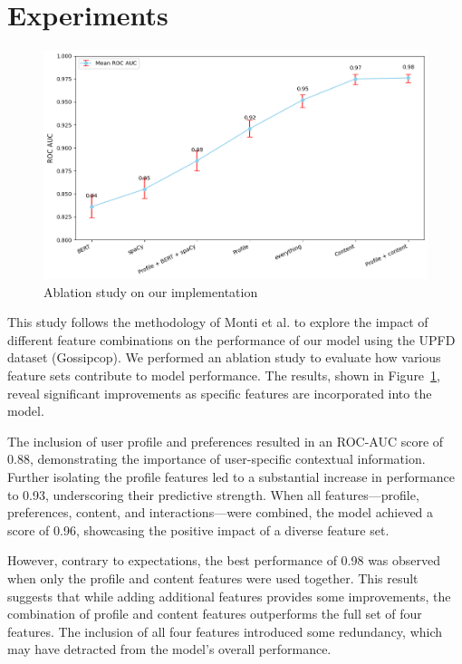 \documentclass[sigconf,nonacm]{acmart}
\begin{document}
\section{Experiments}
\begin{figure}
    \centering
    \includegraphics[scale=0.35]{roc_results.png}
    \caption{Ablation study on our implementation}
    \label{fig:ablation_results}
\end{figure}

This study follows the methodology of Monti et al. \cite{monti2019fakenewsdetectionsocial} to explore the impact of different feature combinations on the performance of our model using the UPFD dataset (Gossipcop). We performed an ablation study to evaluate how various feature sets contribute to model performance. The results, shown in Figure~\ref{fig:ablation_results}, reveal significant improvements as specific features are incorporated into the model.

The inclusion of user profile and preferences resulted in an ROC-AUC score of 0.88, demonstrating the importance of user-specific contextual information. Further isolating the profile features led to a substantial increase in performance to 0.93, underscoring their predictive strength. When all features—profile, preferences, content, and interactions—were combined, the model achieved a score of 0.96, showcasing the positive impact of a diverse feature set.

However, contrary to expectations, the best performance of 0.98 was observed when only the profile and content features were used together. This result suggests that while adding additional features provides some improvements, the combination of profile and content features outperforms the full set of four features. The inclusion of all four features introduced some redundancy, which may have detracted from the model’s overall performance. 
\end{document}
